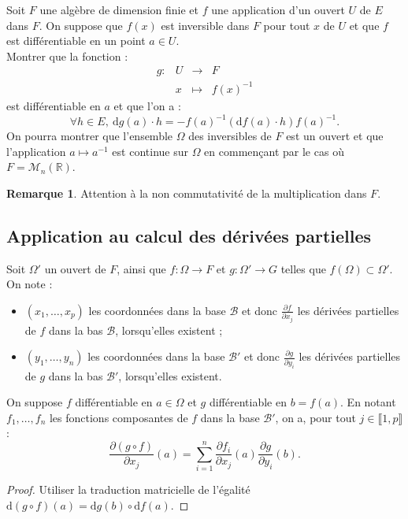 \documentclass[french]{article}
\newcommand{\R}{\mathbb{R}}
\newcommand{\inv}{^{-1}}
\renewcommand{\d}{\text{d}}
\theoremstyle{plain}
\theoremstyle{definition}
\newtheorem*{rmq}{Remarque}
\theoremstyle{remark}
\begin{document}
\begin{exo}[$\star$]
	Soit $F$ une algèbre de dimension finie et $f$ une application d'un ouvert $U$ de $E$ dans $F$. On suppose que $f(x)$ est inversible dans $F$ pour tout $x$ de $U$ et que $f$ est différentiable en un point $a\in U$.\\
	Montrer que la fonction :
	$$\begin{array}{lrcl}
		g:&U&\longrightarrow&F\\
		&x&\longmapsto&f(x)\inv
	\end{array}$$ est différentiable en $a$ et que l'on a :
	$$\forall h\in E,\ \d g(a)\cdot h=-f(a)\inv(\d f(a)\cdot h)f(a)\inv.$$
	On pourra montrer que l'ensemble $\Omega$ des inversibles de $F$ est un ouvert et que l'application $a\mapsto a\inv$ est continue sur $\Omega$ en commençant par le cas où $F=\mathcal{M}_n(\R)$.
	\begin{rmq}
		Attention à la non commutativité de la multiplication dans $F$.
	\end{rmq}
\end{exo}

\subsection{Application au calcul des dérivées partielles}

Soit $\Omega'$ un ouvert de $F$, ainsi que $f:\Omega\to F$ et $g:\Omega'\to G$ telles que $f(\Omega)\subset\Omega'$. On note :
\begin{itemize}
	\item $(x_1,\ldots,x_p)$ les coordonnées dans la base $\mathcal{B}$ et donc $\displaystyle\frac{\partial f}{\partial x_j}$ les dérivées partielles de $f$ dans la bas $\mathcal{B}$, lorsqu'elles existent ;
	\item $(y_1,\ldots,y_n)$ les coordonnées dans la base $\mathcal{B}'$ et donc $\displaystyle\frac{\partial g}{\partial y_i}$ les dérivées partielles de $g$ dans la bas $\mathcal{B}'$, lorsqu'elles existent.
\end{itemize}

\begin{prop}%
	On suppose $f$ différentiable en $a\in\Omega$ et $g$ différentiable en $b=f(a)$. En notant $f_1,\ldots,f_n$ les fonctions composantes de $f$ dans la base $\mathcal{B}'$, on a, pour tout $j\in\llbracket1,p\rrbracket$ :
	$$\frac{\partial (g\circ f)}{\partial x_j}(a)=\sum_{i=1}^{n}\frac{\partial f_i}{\partial x_j}(a)\frac{\partial g}{\partial y_i}(b).$$
\end{prop}
\begin{proof}
	Utiliser la traduction matricielle de l'égalité $\d (g\circ f)(a)=\d g(b)\circ\d f(a)$.
\end{proof}
\end{document}
